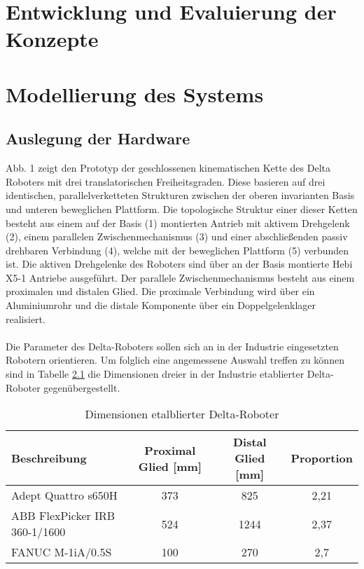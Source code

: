 \documentclass[Bachelor, BMR, ngerman]{twbook}
\begin{document}
\chapter{Entwicklung und Evaluierung der Konzepte}
\chapter{Modellierung des Systems}
\section{Auslegung der Hardware}

    Abb. 1 zeigt den Prototyp der geschlossenen kinematischen Kette des Delta Roboters mit drei translatorischen Freiheitsgraden. Diese basieren auf drei identischen, parallelverketteten Strukturen zwischen der oberen invarianten Basis und unteren beweglichen Plattform. Die topologische Struktur einer dieser Ketten besteht aus einem auf der Basis (1) montierten Antrieb mit aktivem Drehgelenk (2), einem parallelen Zwischenmechanismus (3) und einer abschließenden passiv drehbaren Verbindung (4), welche mit der beweglichen Plattform (5) verbunden ist. Die aktiven Drehgelenke des Roboters sind über an der Basis montierte Hebi X5-1 Antriebe ausgeführt. Der parallele Zwischenmechanismus besteht aus einem proximalen und distalen Glied. Die proximale Verbindung wird über ein Aluminiumrohr und die distale Komponente über ein Doppelgelenklager realisiert.\\
    \\
    Die Parameter des Delta-Roboters sollen sich an in der Industrie eingesetzten Robotern orientieren. Um folglich eine angemessene Auswahl treffen zu können sind in Tabelle \ref{tab1} die Dimensionen dreier in der Industrie etablierter Delta-Roboter gegenübergestellt.

    \begin{table}[!htbp]
        \centering
        \caption{Dimensionen etalblierter Delta-Roboter }\label{tab1}
            \begin{tabular}{| l | c | c | c |}\hline \rowcolor[gray]{0.8}
                Beschreibung & Proximal Glied [mm] & Distal Glied [mm]  & Proportion\\\hline
                Adept Quattro s650H & 373 & 825 & 2,21\\\hline
                ABB FlexPicker IRB 360-1/1600 & 524 & 1244 & 2,37\\\hline
                FANUC M-1iA/0.5S &  100 & 270 & 2,7\\\hline
            \end{tabular}
    \end{table}
    
\end{document}
